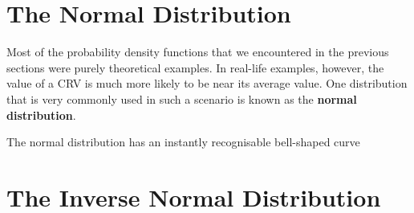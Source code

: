 \documentclass[../../main.tex]{subfiles}
\begin{document}
\newpage

\section{The Normal Distribution}

Most of the probability density functions that we encountered in the previous sections were purely theoretical examples. In real-life examples, however, the value of a CRV is much more likely to be near its average value. One distribution that is very commonly used in such a scenario is known as the \textbf{normal distribution}. 

The normal distribution has an instantly recognisable bell-shaped curve
\begin{center}
\end{center}
\section{The Inverse Normal Distribution}
\end{document}
